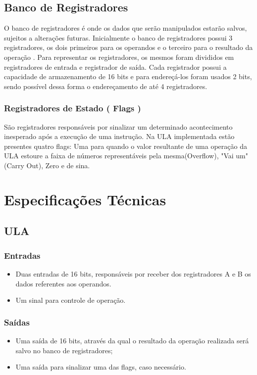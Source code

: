 \documentclass{report}
\begin{document}
\section{Banco de Registradores}
O banco de registradores é onde os dados que serão manipulados estarão salvos, sujeitos a alterações futuras. Inicialmente o banco de registradores possui 3 registradores, os dois primeiros para os operandos e o terceiro para o resultado da operação .
Para representar os registradores, os mesmos foram divididos em registradores de entrada e registrador de saída. Cada registrador possui a capacidade de armazenamento de 16 bits e para endereçá-los foram usados 2 bits, sendo possível dessa forma o endereçamento de até 4 registradores.


\subsection{Registradores de Estado ( Flags )}
São registradores responsáveis por sinalizar um determinado acontecimento inesperado após a execução de uma instrução. Na ULA implementada estão presentes quatro flags: Uma para quando o valor resultante de uma operação da ULA estoure a faixa de números representáveis pela mesma(Overflow), "Vai um" (Carry Out), Zero e de sina.



\chapter{Especificações Técnicas}
    \section{ULA}
    \subsection{Entradas}
\begin{itemize}
\item Duas entradas de 16 bits, responsáveis por receber dos registradores A e B os dados referentes aos operandos.
\item Um sinal para controle de operação.
\end{itemize}


    \subsection{Saídas}
\begin{itemize}
\item Uma saída de 16 bits, através da qual o resultado da operação realizada será salvo no banco de registradores;
\item Uma saída para sinalizar uma das flags, caso necessário.
\end{itemize}
\end{document}

